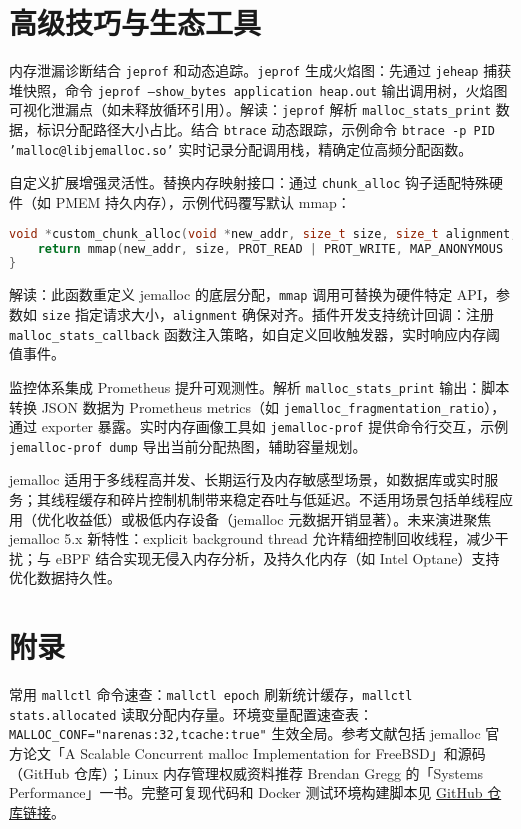 \chapter{高级技巧与生态工具}
内存泄漏诊断结合 \texttt{jeprof} 和动态追踪。\texttt{jeprof} 生成火焰图：先通过 \texttt{jeheap} 捕获堆快照，命令 \texttt{jeprof --show\_{}bytes application heap.out} 输出调用树，火焰图可视化泄漏点（如未释放循环引用）。解读：\texttt{jeprof} 解析 \texttt{malloc\_{}stats\_{}print} 数据，标识分配路径大小占比。结合 \texttt{btrace} 动态跟踪，示例命令 \texttt{btrace -p PID 'malloc@libjemalloc.so'} 实时记录分配调用栈，精确定位高频分配函数。\par
自定义扩展增强灵活性。替换内存映射接口：通过 \texttt{chunk\_{}alloc} 钩子适配特殊硬件（如 PMEM 持久内存），示例代码覆写默认 mmap：\par
\begin{lstlisting}[language=c]
void *custom_chunk_alloc(void *new_addr, size_t size, size_t alignment, bool *zero, bool *commit, unsigned arena_ind) {
    return mmap(new_addr, size, PROT_READ | PROT_WRITE, MAP_ANONYMOUS | MAP_PRIVATE, -1, 0);
}
\end{lstlisting}
解读：此函数重定义 jemalloc 的底层分配，\texttt{mmap} 调用可替换为硬件特定 API，参数如 \texttt{size} 指定请求大小，\texttt{alignment} 确保对齐。插件开发支持统计回调：注册 \texttt{malloc\_{}stats\_{}callback} 函数注入策略，如自定义回收触发器，实时响应内存阈值事件。\par
监控体系集成 Prometheus 提升可观测性。解析 \texttt{malloc\_{}stats\_{}print} 输出：脚本转换 JSON 数据为 Prometheus metrics（如 \texttt{jemalloc\_{}fragmentation\_{}ratio}），通过 exporter 暴露。实时内存画像工具如 \texttt{jemalloc-prof} 提供命令行交互，示例 \texttt{jemalloc-prof dump} 导出当前分配热图，辅助容量规划。\par
jemalloc 适用于多线程高并发、长期运行及内存敏感型场景，如数据库或实时服务；其线程缓存和碎片控制机制带来稳定吞吐与低延迟。不适用场景包括单线程应用（优化收益低）或极低内存设备（jemalloc 元数据开销显著）。未来演进聚焦 jemalloc 5.x 新特性：explicit background thread 允许精细控制回收线程，减少干扰；与 eBPF 结合实现无侵入内存分析，及持久化内存（如 Intel Optane）支持优化数据持久性。\par
\chapter{附录}
常用 \texttt{mallctl} 命令速查：\texttt{mallctl epoch} 刷新统计缓存，\texttt{mallctl stats.allocated} 读取分配内存量。环境变量配置速查表：\texttt{MALLOC\_{}CONF="narenas:32,tcache:true"} 生效全局。参考文献包括 jemalloc 官方论文「A Scalable Concurrent malloc Implementation for FreeBSD」和源码（GitHub 仓库）；Linux 内存管理权威资料推荐 Brendan Gregg 的「Systems Performance」一书。完整可复现代码和 Docker 测试环境构建脚本见 \href{https://github.com/example/jemalloc-bench}{GitHub 仓库链接}。\par
